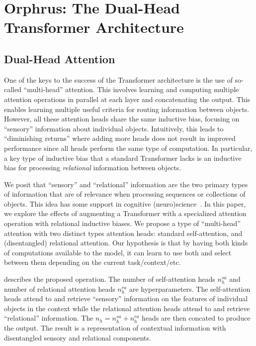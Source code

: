 \section{Orphrus: The Dual-Head Transformer Architecture}

\subsection{Dual-Head Attention}

One of the keys to the success of the Transformer architecture is the use of so-called ``multi-head'' attention. This involves learning and computing multiple attention operations in parallel at each layer and concatenating the output. This enables learning multiple useful criteria for routing information between objects. However, all these attention heads share the same inductive bias, focusing on ``sensory'' information about individual objects. Intuitively, this leads to ``diminishing returns'' where adding more heads does not result in improved performance since all heads perform the same type of computation. In particular, a key type of inductive bias that a standard Transformer lacks is an inductive bias for processing \textit{relational} information between objects.

We posit that ``sensory'' and ``relational'' information are the two primary types of information that are of relevance when processing sequences or collections of objects. This idea has some support  in cognitive (neuro)science~\citep{citation}. In this paper, we explore the effects of augmenting a Transformer with a specialized attention operation with relational inductive biases. We propose a type of ``multi-head'' attention with two distinct types attention heads: standard self-attention, and (disentangled) relational attention. Our hypothesis is that by having both kinds of computations available to the model, it can learn to use both and select between them depending on the current task/context/etc.

 describes the proposed operation. The number of self-attention heads $n_h^{sa}$ and number of relational attention heads $n_h^{ra}$ are hyperparameters. The self-attention heads attend to and retrieve ``sensory'' information on the features of individual objects in the context while the relational attention heads attend to and retrieve ``relational'' information. The $n_h = n_h^{sa} + n_h^{ra}$ heads are then concated to produce the output. The result is a representation of contextual information with disentangled sensory and relational components.


